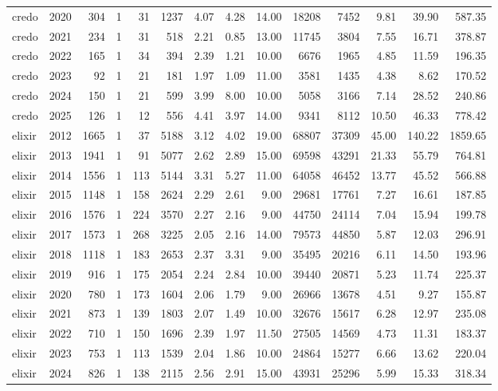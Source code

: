 \begin{table}[htbp]
\begin{tabular}{lrrrrrrrrrrrrr}
credo & 2020 & 304 & 1 & 31 & 1237 & 4.07 & 4.28 & 14.00 & 18208 & 7452 & 9.81 & 39.90 & 587.35 \\
credo & 2021 & 234 & 1 & 31 & 518 & 2.21 & 0.85 & 13.00 & 11745 & 3804 & 7.55 & 16.71 & 378.87 \\
credo & 2022 & 165 & 1 & 34 & 394 & 2.39 & 1.21 & 10.00 & 6676 & 1965 & 4.85 & 11.59 & 196.35 \\
credo & 2023 & 92 & 1 & 21 & 181 & 1.97 & 1.09 & 11.00 & 3581 & 1435 & 4.38 & 8.62 & 170.52 \\
credo & 2024 & 150 & 1 & 21 & 599 & 3.99 & 8.00 & 10.00 & 5058 & 3166 & 7.14 & 28.52 & 240.86 \\
credo & 2025 & 126 & 1 & 12 & 556 & 4.41 & 3.97 & 14.00 & 9341 & 8112 & 10.50 & 46.33 & 778.42 \\
elixir & 2012 & 1665 & 1 & 37 & 5188 & 3.12 & 4.02 & 19.00 & 68807 & 37309 & 45.00 & 140.22 & 1859.65 \\
elixir & 2013 & 1941 & 1 & 91 & 5077 & 2.62 & 2.89 & 15.00 & 69598 & 43291 & 21.33 & 55.79 & 764.81 \\
elixir & 2014 & 1556 & 1 & 113 & 5144 & 3.31 & 5.27 & 11.00 & 64058 & 46452 & 13.77 & 45.52 & 566.88 \\
elixir & 2015 & 1148 & 1 & 158 & 2624 & 2.29 & 2.61 & 9.00 & 29681 & 17761 & 7.27 & 16.61 & 187.85 \\
elixir & 2016 & 1576 & 1 & 224 & 3570 & 2.27 & 2.16 & 9.00 & 44750 & 24114 & 7.04 & 15.94 & 199.78 \\
elixir & 2017 & 1573 & 1 & 268 & 3225 & 2.05 & 2.16 & 14.00 & 79573 & 44850 & 5.87 & 12.03 & 296.91 \\
elixir & 2018 & 1118 & 1 & 183 & 2653 & 2.37 & 3.31 & 9.00 & 35495 & 20216 & 6.11 & 14.50 & 193.96 \\
elixir & 2019 & 916 & 1 & 175 & 2054 & 2.24 & 2.84 & 10.00 & 39440 & 20871 & 5.23 & 11.74 & 225.37 \\
elixir & 2020 & 780 & 1 & 173 & 1604 & 2.06 & 1.79 & 9.00 & 26966 & 13678 & 4.51 & 9.27 & 155.87 \\
elixir & 2021 & 873 & 1 & 139 & 1803 & 2.07 & 1.49 & 10.00 & 32676 & 15617 & 6.28 & 12.97 & 235.08 \\
elixir & 2022 & 710 & 1 & 150 & 1696 & 2.39 & 1.97 & 11.50 & 27505 & 14569 & 4.73 & 11.31 & 183.37 \\
elixir & 2023 & 753 & 1 & 113 & 1539 & 2.04 & 1.86 & 10.00 & 24864 & 15277 & 6.66 & 13.62 & 220.04 \\
elixir & 2024 & 826 & 1 & 138 & 2115 & 2.56 & 2.91 & 15.00 & 43931 & 25296 & 5.99 & 15.33 & 318.34 \\

\end{tabular}
\end{table}
